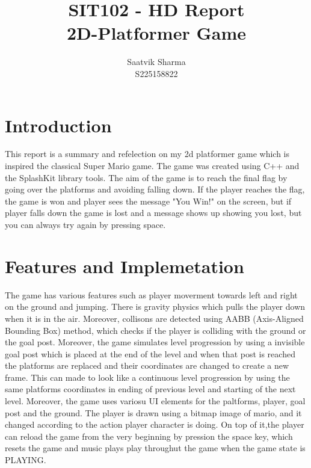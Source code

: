 \documentclass[11pt]{article}
\title{SIT102 - HD Report \\ 2D-Platformer Game}
\author{Saatvik Sharma \\ S225158822}
\date{}
\begin{document}
\maketitle
\newpage
\tableofcontents
\newpage


\section{Introduction}

This report is a summary and refelection on my 2d platformer game which is inspired the classical Super Mario game. The game was created using C++ and the SplashKit library tools. The aim of the game is to reach the final flag by going over the platforms and avoiding falling down. If the player reaches the flag, the game is won and player sees the message "You Win!" on the screen, but if player falls down the game is lost and a message shows up showing you lost, but you can always try again by pressing space.



\section{Features and Implemetation}

The game has various features such as player moverment towards left and right on the ground and jumping. There is gravity physics which pulls the player down when it is in the air. Moreover, collisons are detected using AABB (Axis-Aligned Bounding Box) method, which checks if the player is colliding with the ground or the goal post. Moreover, the game simulates level progression by using a invisible goal post which is placed at the end of the level and when that post is reached the platforms are replaced and their coordinates are changed to create a new frame. This can made to look like a continuous level progression by using the same platforms coordinates in ending of previous level and starting of the next level.
Moreover, the game uses variosu UI elements for the paltforms, player, goal post and the ground. The player is drawn using a bitmap image of mario, and it changed according to the action player character is doing. On top of it,the player can reload the game from the very beginning by pression the space key, which resets the game and music plays play throughut the game when the game state is PLAYING.
\end{document}
